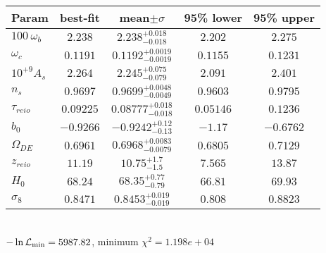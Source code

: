 \begin{tabular}{|l|c|c|c|c|} 
 \hline 
Param & best-fit & mean$\pm\sigma$ & 95\% lower & 95\% upper \\ \hline 
$100~\omega_{b }$ &$2.238$ & $2.238_{-0.018}^{+0.018}$ & $2.202$ & $2.275$ \\ 
$\omega_c$ &$0.1191$ & $0.1192_{-0.0019}^{+0.0019}$ & $0.1155$ & $0.1231$ \\ 
$10^{+9}A_{s }$ &$2.264$ & $2.245_{-0.079}^{+0.075}$ & $2.091$ & $2.401$ \\ 
$n_{s }$ &$0.9697$ & $0.9699_{-0.0049}^{+0.0048}$ & $0.9603$ & $0.9795$ \\ 
$\tau_{reio }$ &$0.09225$ & $0.08777_{-0.018}^{+0.018}$ & $0.05146$ & $0.1236$ \\ 
$b_{0 }$ &$-0.9266$ & $-0.9242_{-0.13}^{+0.12}$ & $-1.17$ & $-0.6762$ \\ 
$\Omega_{DE}$ &$0.6961$ & $0.6968_{-0.0079}^{+0.0083}$ & $0.6805$ & $0.7129$ \\ 
$z_{reio }$ &$11.19$ & $10.75_{-1.5}^{+1.7}$ & $7.565$ & $13.87$ \\ 
$H_{0 }$ &$68.24$ & $68.35_{-0.79}^{+0.77}$ & $66.81$ & $69.93$ \\ 
$\sigma_8$ &$0.8471$ & $0.8453_{-0.019}^{+0.019}$ & $0.808$ & $0.8823$ \\ 
\hline 
 \end{tabular} \\ 
$-\ln{\cal L}_\mathrm{min} =5987.82$, minimum $\chi^2=1.198e+04$ \\ 
